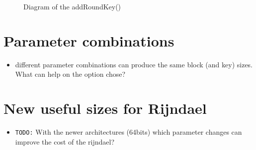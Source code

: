 \documentclass[10pt,a4paper,twoside]{llncs}
\begin{document}
\begin{figure}
\begin{center}
\caption{Diagram of the addRoundKey()}%
\label{fig:addRoundKey}
\end{center}
\end{figure}


\section{Parameter combinations}\label{sec:parameterCombinations}
\begin{itemize}
 \item different parameter combinations can produce the same block (and key) sizes. What can help on the option chose?
\end{itemize}


\section{New useful sizes for Rijndael}\label{sec:newSizes}
\begin{itemize}
 \item \texttt{TODO:} With the newer architectures (64bits) which parameter changes can improve the cost of the rijndael? \cite{Daemen:1999:EBC:1267115.1267119}
\end{itemize}

% 



\end{document}
